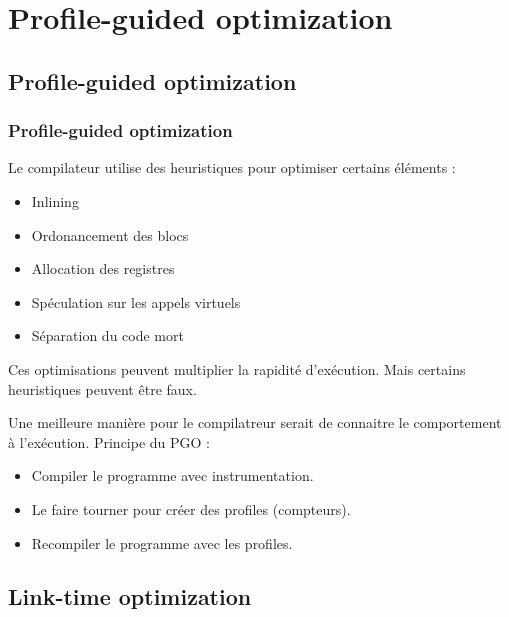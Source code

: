 \documentclass{beamer}
\begin{document}
\section{Profile-guided optimization}

\begin{frame}
    \tableofcontents[currentsection]
\end{frame}

\subsection{Profile-guided optimization}

\begin{frame}
    \frametitle{Profile-guided optimization}

    Le compilateur utilise des heuristiques pour optimiser certains éléments :
    \begin{itemize}
        \item Inlining
        \item Ordonancement des blocs
        \item Allocation des registres
        \item Spéculation sur les appels virtuels
        \item Séparation du code mort
    \end{itemize}
    Ces optimisations peuvent multiplier la rapidité d'exécution.
    Mais certains heuristiques peuvent être faux.
\end{frame}

\begin{frame}
    Une meilleure manière pour le compilatreur serait de connaitre le comportement à l'exécution.
    Principe du PGO :
    \begin{itemize}
        \item Compiler le programme avec instrumentation.
        \item Le faire tourner pour créer des profiles (compteurs).
        \item Recompiler le programme avec les profiles.
    \end{itemize}
\end{frame}

\subsection{Link-time optimization}
\end{document}
